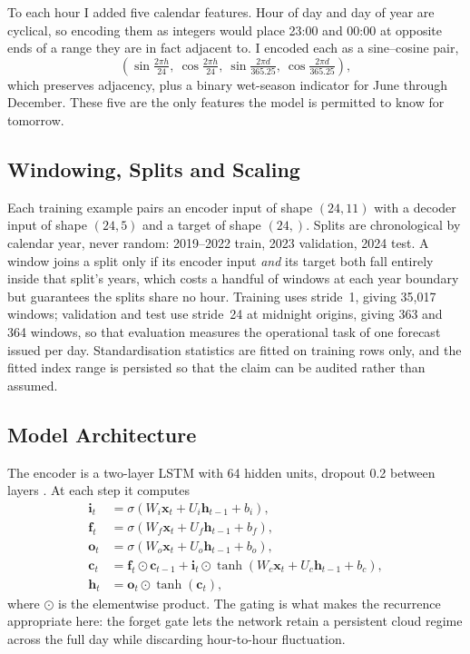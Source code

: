 \documentclass{article}
\def\x{{\mathbf x}}
\begin{document}
To each hour I added five calendar features. Hour of day and day of year are
cyclical, so encoding them as integers would place 23:00 and 00:00 at opposite
ends of a range they are in fact adjacent to. I encoded each as a sine--cosine
pair,
\begin{equation}
    \left(\sin\tfrac{2\pi h}{24},\ \cos\tfrac{2\pi h}{24},\
          \sin\tfrac{2\pi d}{365.25},\ \cos\tfrac{2\pi d}{365.25}\right),
\end{equation}
which preserves adjacency, plus a binary wet-season indicator for June through
December. These five are the only features the model is permitted to know for
tomorrow.

\subsection{Windowing, Splits and Scaling}

Each training example pairs an encoder input of shape $(24, 11)$ with a decoder
input of shape $(24, 5)$ and a target of shape $(24,)$. Splits are chronological
by calendar year, never random: 2019--2022 train, 2023 validation, 2024 test. A
window joins a split only if its encoder input \emph{and} its target both fall
entirely inside that split's years, which costs a handful of windows at each year
boundary but guarantees the splits share no hour. Training uses stride~1, giving
35{,}017 windows; validation and test use stride~24 at midnight origins, giving
363 and 364 windows, so that evaluation measures the operational task of one
forecast issued per day. Standardisation statistics are fitted on training rows
only, and the fitted index range is persisted so that the claim can be audited
rather than assumed.

\subsection{Model Architecture}

The encoder is a two-layer LSTM \cite{hochreiter1997long} with 64 hidden units,
dropout 0.2 between layers \cite{srivastava2014dropout}. At each step it computes
\begin{align}
    \mathbf{i}_t &= \sigma(W_i \x_t + U_i \mathbf{h}_{t-1} + b_i), \\
    \mathbf{f}_t &= \sigma(W_f \x_t + U_f \mathbf{h}_{t-1} + b_f), \\
    \mathbf{o}_t &= \sigma(W_o \x_t + U_o \mathbf{h}_{t-1} + b_o), \\
    \mathbf{c}_t &= \mathbf{f}_t \odot \mathbf{c}_{t-1}
                    + \mathbf{i}_t \odot \tanh(W_c \x_t + U_c \mathbf{h}_{t-1} + b_c), \\
    \mathbf{h}_t &= \mathbf{o}_t \odot \tanh(\mathbf{c}_t),
\end{align}
where $\odot$ is the elementwise product. The gating is what makes the recurrence
appropriate here: the forget gate lets the network retain a persistent cloud
regime across the full day while discarding hour-to-hour fluctuation.
\end{document}
